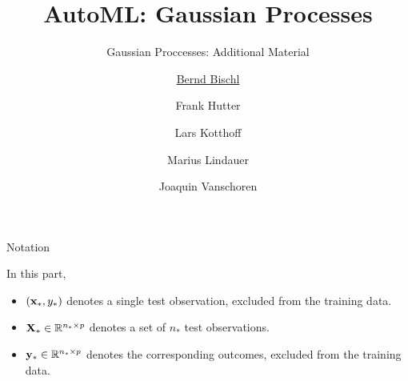 



\newcommand{\lz}{\vspace{0.5cm}}
\newcommand{\thetab}{\bm{\weights}}
\newcommand{\zero}{\mathbf{0}}
\newcommand{\Xmat}{\mathbf{X}}
\newcommand{\ydat}{\mathbf{y}}
\newcommand{\id}{\boldsymbol{I}}
\newcommand{\Amat}{\mathbf{A}}
\newcommand{\Xspace}{\mathcal{X}}                                           
\newcommand{\Yspace}{\mathcal{Y}}
\newcommand{\ls}{\ell}
\newcommand{\natnum}{\mathbb{N}}
\newcommand{\intnum}{\mathbb{Z}}

\usepackage{fontawesome}
\usepackage{dirtytalk}
\usepackage{csquotes}



\title[AutoML: GPs]{AutoML: Gaussian Processes} %
\subtitle{Gaussian Proccesses: Additional Material} %
\author[Marius Lindauer]{\underline{Bernd Bischl} \and Frank Hutter \and Lars Kotthoff\newline \and Marius Lindauer \and Joaquin Vanschoren}
\institute{}
\date{}




\maketitle

\begin{frame}[c]{Notation}

In this part,
\vspace{.3cm}
\begin{itemize}
\item $(\mathbf{x}_*, y_*)$ denotes a single test observation, excluded from the training data.
\vspace{.7cm}
\item $\Xmat_* \in \realnum^{n_* \times p}$ denotes a set of $n_*$ test observations. 
\vspace{.7cm}
\item $\ydat_* \in \realnum^{n_* \times p}$ denotes the corresponding outcomes, excluded from the training data.
\end{itemize}

\end{frame}


